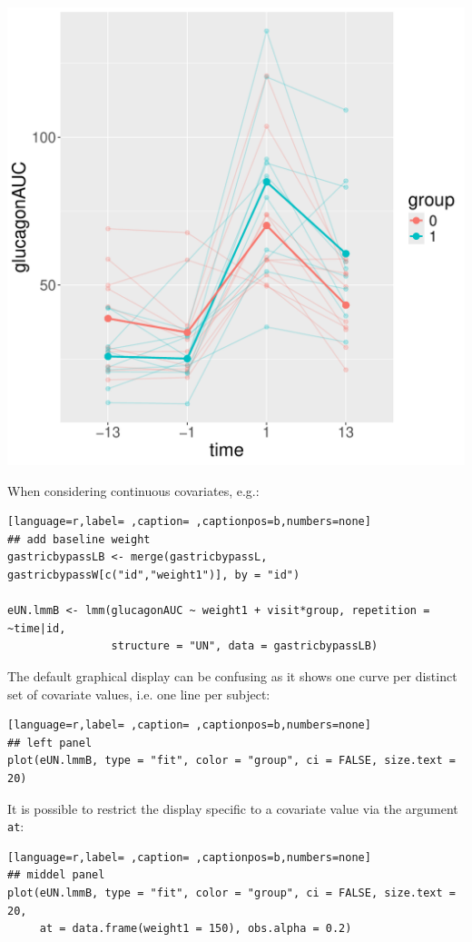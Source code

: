 \documentclass[12pt]{article}
\begin{document}
\begin{minipage}{0.3\linewidth}
\begin{center}
\includegraphics[width=\textwidth]{./figures/fitAll-autoplot.pdf}
\end{center}
\end{minipage}


When considering continuous covariates, e.g.:
\begin{lstlisting}[language=r,label= ,caption= ,captionpos=b,numbers=none]
## add baseline weight
gastricbypassLB <- merge(gastricbypassL, gastricbypassW[c("id","weight1")], by = "id")

eUN.lmmB <- lmm(glucagonAUC ~ weight1 + visit*group, repetition = ~time|id,
                structure = "UN", data = gastricbypassLB)
\end{lstlisting}


\noindent The default graphical display can be confusing as it shows
one curve per distinct set of covariate values, i.e. one line per
subject:
\begin{lstlisting}[language=r,label= ,caption= ,captionpos=b,numbers=none]
## left panel
plot(eUN.lmmB, type = "fit", color = "group", ci = FALSE, size.text = 20)
\end{lstlisting}

It is possible to restrict the display specific to a covariate value
via the argument \texttt{at}:
\begin{lstlisting}[language=r,label= ,caption= ,captionpos=b,numbers=none]
## middel panel
plot(eUN.lmmB, type = "fit", color = "group", ci = FALSE, size.text = 20,
     at = data.frame(weight1 = 150), obs.alpha = 0.2)
\end{lstlisting}
\end{document}
